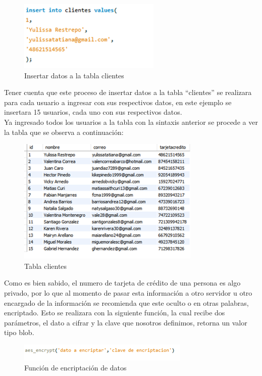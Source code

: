 \documentclass[9pt,24pt,twocolumn]{article}
\begin{document}
\begin{figure}[h]
\begin{flushleft}
    \includegraphics{bas2}
\end{flushleft}
\caption{Insertar datos a la tabla clientes}
  \label{fig:2}
\end{figure}

{Tener cuenta que este proceso de insertar datos a la tabla “clientes” se realizara para cada usuario a ingresar con sus respectivos datos, en este ejemplo se insertara 15 usuarios, cada uno con sus respectivos datos.}
\\

{Ya ingresado todos los usuarios a la tabla con la sintaxis anterior se procede a ver la tabla que se observa a continuación:}

\begin{figure}[h]
\begin{flushleft}
    \includegraphics{bas3}
\end{flushleft}
  \caption{Tabla clientes}
  \label{fig:3}
\end{figure}

{Como es bien sabido, el numero de tarjeta de crédito de una persona es algo privado, por lo que al momento de pasar esta información a otro servidor u otro encargado de la información se recomienda que este oculto o en otras palabras, encriptado. Esto se realizara con la siguiente función, la cual recibe dos parámetros, el dato a cifrar y la clave que nosotros definimos, retorna un valor tipo blob.}

\begin{figure}[h]
\begin{flushleft}
    \includegraphics{bas4}
\end{flushleft}
  \caption{Función de encriptación de datos}
  \label{fig:4}
\end{figure}
\end{document}
